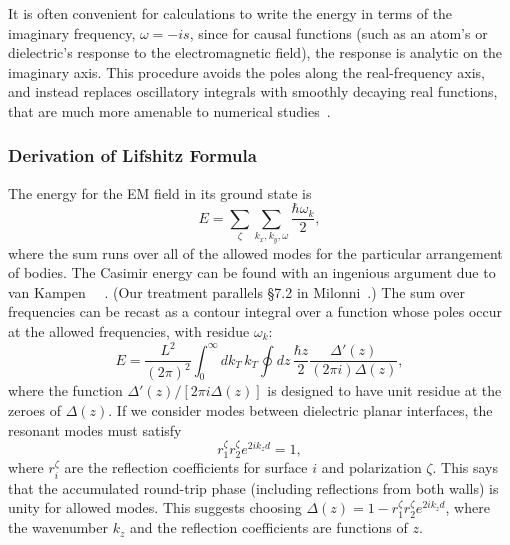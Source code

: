 It is often convenient for calculations to write the energy in terms of the imaginary frequency, $\omega = -is$,
since for causal functions (such as an atom's or dielectric's response to the electromagnetic field), 
the response is analytic on the imaginary axis.    
This procedure avoids the poles along the real-frequency axis, and instead replaces oscillatory
integrals with smoothly decaying real functions, that are much more amenable to numerical studies~\cite{Johnson2011}.

\subsubsection{Derivation of Lifshitz Formula}

The energy for the EM field in its ground state is 
\begin{equation}
  E = \sum_{\zeta}\sum_{k_x,k_y,\omega} \frac{\hbar\omega_k}{2},
\end{equation}
where the sum runs over all of the allowed modes for the particular arrangement of bodies.  
The Casimir energy can be found with an ingenious argument due to van Kampen~\etal
~\cite{vanKampen1968}.  (Our treatment parallels \S 7.2 in Milonni~\cite{Milonni1994}.)
The sum over frequencies can be recast as a contour integral over a function whose poles occur at the allowed
frequencies, with residue $\omega_k$:  
\begin{equation}
  E = \frac{L^2}{(2\pi)^2}\int_0^\infty dk_T\,k_T\oint dz\, \frac{\hbar z}{2} \frac{\Delta'(z)}{(2\pi i)\Delta(z)},
\end{equation}
where the function $\Delta'(z)/[2\pi i\Delta(z)]$ is designed to have unit residue at the zeroes of $\Delta(z)$. 
If we consider modes between dielectric planar interfaces, the resonant modes must satisfy
\begin{equation}
  r^{\zeta}_1r^{\zeta}_2 e^{2ik_z d}=1,
\end{equation}
where $r^\zeta_i$ are the reflection coefficients for surface $i$ and polarization $\zeta$.
This says that the accumulated round-trip phase (including reflections from both walls) is unity for
allowed modes.  
This suggests choosing $\Delta(z) = 1-r^{\zeta}_1r^{\zeta}_2 e^{2ik_z d}$, where the wavenumber $k_z$
and the reflection coefficients are functions of $z$.  

